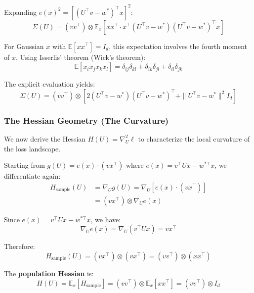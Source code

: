 \documentclass[
  journal=largetwo,
  simfonts=false,
  year=2025,
  volume=37,
]{cup-journal}
\begin{document}
Expanding $e(x)^2 = [(U^\top v - w^*)^\top x]^2$:
\begin{equation}\label{eq:sigma_explicit}
    \Sigma(U) = (v v^\top) \otimes \mathbb{E}_x \left[ x x^\top \cdot x^\top (U^\top v - w^*)(U^\top v - w^*)^\top x \right]
\end{equation}

For Gaussian $x$ with $\mathbb{E}[x x^\top] = I_d$, this expectation involves the fourth moment of $x$. Using Isserlis' theorem (Wick's theorem):
\begin{equation}
    \mathbb{E}[x_i x_j x_k x_l] = \delta_{ij}\delta_{kl} + \delta_{ik}\delta_{jl} + \delta_{il}\delta_{jk}
\end{equation}

The explicit evaluation yields:
\begin{equation}
    \Sigma(U) = (v v^\top) \otimes \left[ 2(U^\top v - w^*)(U^\top v - w^*)^\top + \|U^\top v - w^*\|^2 I_d \right]
\end{equation}



\subsubsection{The Hessian Geometry (The Curvature)}

We now derive the Hessian $H(U) = \nabla^2_U \ell$ to characterize the local curvature of the loss landscape.

Starting from $g(U) = e(x) \cdot (v x^\top)$ where $e(x) = v^\top U x - w^{*\top} x$, we differentiate again:
\begin{align}
    H_{\text{sample}}(U) &= \nabla_U g(U) = \nabla_U \left[ e(x) \cdot (v x^\top) \right] \nonumber \\
    &= (v x^\top) \otimes \nabla_U e(x)
\end{align}

Since $e(x) = v^\top U x - w^{*\top} x$, we have:
\begin{equation}
    \nabla_U e(x) = \nabla_U (v^\top U x) = v x^\top
\end{equation}

Therefore:
\begin{equation}
    H_{\text{sample}}(U) = (v x^\top) \otimes (v x^\top) = (v v^\top) \otimes (x x^\top)
\end{equation}

The \textbf{population Hessian} is:
\begin{equation}\label{eq:hessian_explicit}
    \boxed{H(U) = \mathbb{E}_x[H_{\text{sample}}] = (v v^\top) \otimes \mathbb{E}_x[x x^\top] = (v v^\top) \otimes I_d}
\end{equation}
\end{document}
